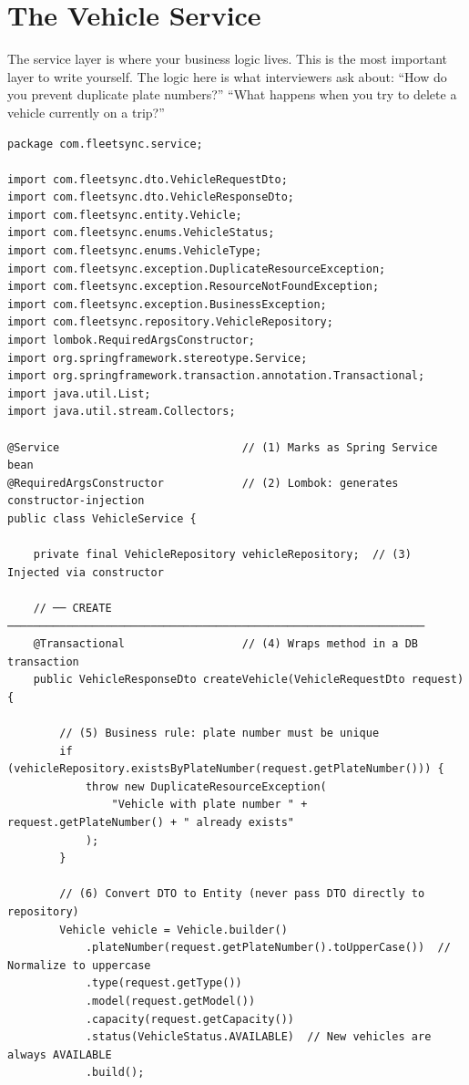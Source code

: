 \documentclass[12pt,a4paper]{report}
\begin{document}
\section{The Vehicle Service}

\begin{tcolorbox}[handbox]
The service layer is where your business logic lives. This is the most important layer to write yourself. The logic here is what interviewers ask about: ``How do you prevent duplicate plate numbers?'' ``What happens when you try to delete a vehicle currently on a trip?''
\end{tcolorbox}

\begin{lstlisting}[caption=VehicleService.java -- Business Logic Layer]
package com.fleetsync.service;

import com.fleetsync.dto.VehicleRequestDto;
import com.fleetsync.dto.VehicleResponseDto;
import com.fleetsync.entity.Vehicle;
import com.fleetsync.enums.VehicleStatus;
import com.fleetsync.enums.VehicleType;
import com.fleetsync.exception.DuplicateResourceException;
import com.fleetsync.exception.ResourceNotFoundException;
import com.fleetsync.exception.BusinessException;
import com.fleetsync.repository.VehicleRepository;
import lombok.RequiredArgsConstructor;
import org.springframework.stereotype.Service;
import org.springframework.transaction.annotation.Transactional;
import java.util.List;
import java.util.stream.Collectors;

@Service                            // (1) Marks as Spring Service bean
@RequiredArgsConstructor            // (2) Lombok: generates constructor-injection
public class VehicleService {

    private final VehicleRepository vehicleRepository;  // (3) Injected via constructor

    // ── CREATE ────────────────────────────────────────────────────────────────
    @Transactional                  // (4) Wraps method in a DB transaction
    public VehicleResponseDto createVehicle(VehicleRequestDto request) {

        // (5) Business rule: plate number must be unique
        if (vehicleRepository.existsByPlateNumber(request.getPlateNumber())) {
            throw new DuplicateResourceException(
                "Vehicle with plate number " + request.getPlateNumber() + " already exists"
            );
        }

        // (6) Convert DTO to Entity (never pass DTO directly to repository)
        Vehicle vehicle = Vehicle.builder()
            .plateNumber(request.getPlateNumber().toUpperCase())  // Normalize to uppercase
            .type(request.getType())
            .model(request.getModel())
            .capacity(request.getCapacity())
            .status(VehicleStatus.AVAILABLE)  // New vehicles are always AVAILABLE
            .build();


\end{lstlisting}
\end{document}
